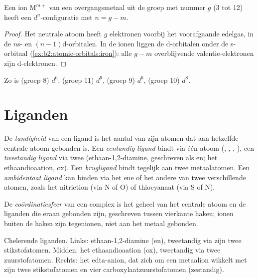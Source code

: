 \begin{proposition}\label{prop:b2:coordination-complexes:dn}
Een ion $\mathrm M^{m+}$ van een overgangsmetaal uit de groep met nummer $g$ (3 tot 12) heeft een
$d^n$-configuratie met $n = g - m$.
\end{proposition}

\begin{proof}
Het neutrale atoom heeft $g$ elektronen voorbij het voorafgaande edelgas, in de $n$s- en
$(n - 1)$d-orbitalen. In de ionen liggen de d-orbitalen onder de s-orbitaal
(\cref{ex:b2:atomic-orbitals:iron}): alle $g - m$ overblijvende valentie-elektronen zijn
d-elektronen.
\end{proof}

Zo is  (groep 8) $d^6$,  (groep 11) $d^9$,  (groep 9)
$d^6$,  (groep 10) $d^8$.

\section{Liganden}

\begin{definition}[Tandigheid]\label{def:b2:coordination-complexes:denticity}
De \emph{tandigheid} van een ligand is het aantal van zijn atomen dat aan
hetzelfde centrale atoom gebonden is. Een \emph{eentandig ligand} bindt
via één atoom (, , , ), een \emph{tweetandig
ligand} via twee (ethaan-1,2-diamine, geschreven als en; het
ethaandioaation, ox). Een \emph{brugligand} bindt tegelijk aan twee
metaalatomen. Een \emph{ambidentaat ligand} kan binden
via het ene of het andere van twee verschillende atomen, zoals het nitrietion (via N of O) of
thiocyanaat (via S of N).
\end{definition}

\begin{definition}[Coördinatiesfeer]\label{def:b2:coordination-complexes:coordination-sphere}
De \emph{coördinatiesfeer} van een complex is het geheel van
het centrale atoom en de liganden die eraan gebonden zijn, geschreven tussen vierkante haken; ionen
buiten de haken zijn tegenionen, niet aan het metaal gebonden.
\end{definition}

\begin{omfigure}
\qquad
{}
\qquad
{}

\medskip
{\small Chelerende liganden. Links: ethaan-1,2-diamine (en), tweetandig via zijn twee
stikstofatomen. Midden: het ethaandioaation (ox), tweetandig via twee zuurstofatomen. Rechts:
het edta-anion, dat zich om een metaalion wikkelt met zijn twee stikstofatomen en vier
carboxylaatzuurstofatomen (zestandig).}
\end{omfigure}

